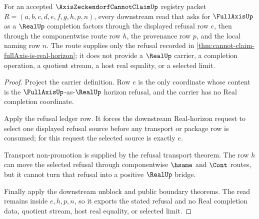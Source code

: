 \begin{theorem}
\label{thm:axis-zeckendorf-cannot-claim-real-refusal-route}
For an accepted $\AxisZeckendorfCannotClaimUp$ registry packet $R=(a,b,c,d,e,f,g,h,p,n)$, every downstream read that asks for $\FullAxisUp$ as a $\RealUp$ completion factors through the displayed refusal row $e$, then through the componentwise route row $h$, the provenance row $p$, and the local naming row $n$. The route supplies only the refusal recorded in \autoref{thm:cannot-claim-fullAxis-is-real-horizon}; it does not provide a $\RealUp$ carrier, a completion operation, a quotient stream, a host real equality, or a selected limit.
\end{theorem}
\begin{proof}
Project the carrier definition. Row $e$ is the only coordinate whose content is the $\FullAxisUp$-as-$\RealUp$ horizon refusal, and the carrier has no Real completion coordinate.

Apply the refusal ledger row. It forces the downstream Real-horizon request to select one displayed refusal source before any transport or package row is consumed; for this request the selected source is exactly $e$.

Transport non-promotion is supplied by the refusal transport theorem. The row $h$ can move the selected refusal through componentwise $\hsame$ and $\Cont$ routes, but it cannot turn that refusal into a positive $\RealUp$ bridge.

Finally apply the downstream unblock and public boundary theorems. The read remains inside $e,h,p,n$, so it exports the stated refusal and no Real completion data, quotient stream, host real equality, or selected limit.
\end{proof}

